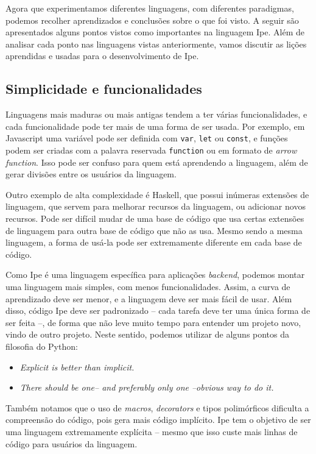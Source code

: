 Agora que experimentamos diferentes linguagens, com diferentes paradigmas, podemos
recolher aprendizados e conclusões sobre o que foi visto. A seguir são apresentados
alguns pontos vistos como importantes na linguagem Ipe. Além de analisar cada ponto
nas linguagens vistas anteriormente, vamos discutir as lições aprendidas e usadas
para o desenvolvimento de Ipe.

\subsection{Simplicidade e funcionalidades}

Linguagens mais maduras ou mais antigas tendem a ter várias funcionalidades, e
cada funcionalidade pode ter mais de uma forma de ser usada. Por exemplo, em
Javascript uma variável pode ser definida com \texttt{var}, \texttt{let} ou
\texttt{const}, e funções podem ser criadas com a palavra reservada \texttt{function}
ou em formato de \textit{arrow function}. Isso pode ser confuso para quem está
aprendendo a linguagem, além de gerar divisões entre os usuários da linguagem.

Outro exemplo de alta complexidade é Haskell, que possui inúmeras extensões de
linguagem, que servem para melhorar recursos da linguagem, ou adicionar novos
recursos. Pode ser difícil mudar de uma base de código que usa certas extensões
de linguagem para outra base de código que não as usa. Mesmo sendo a mesma linguagem,
a forma de usá-la pode ser extremamente diferente em cada base de código.

Como Ipe é uma linguagem específica para aplicações \textit{backend}, podemos
montar uma linguagem mais simples, com menos funcionalidades. Assim, a curva de
aprendizado deve ser menor, e a linguagem deve ser mais fácil de usar. Além disso,
código Ipe deve ser padronizado -- cada tarefa deve ter uma única forma de ser feita --,
de forma que não leve muito tempo para entender um projeto novo, vindo de outro projeto.
Neste sentido, podemos utilizar de alguns pontos da filosofia do Python:

\begin{itemize}
  \item \textit{Explicit is better than implicit.}
  \item \textit{There should be one-- and preferably only one --obvious way to do it.}
\end{itemize}

\cite{zenofpython}

Também notamos que o uso de \textit{macros}, \textit{decorators} e tipos polimórficos
dificulta a compreensão do código, pois gera mais código implícito. Ipe tem o objetivo
de ser uma linguagem extremamente explícita -- mesmo que isso custe mais linhas
de código para usuários da linguagem.

